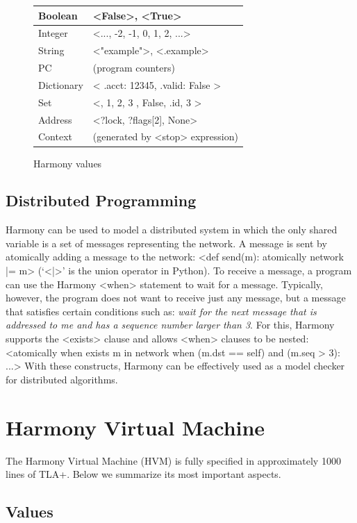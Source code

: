 \documentclass[twocolumn]{article}
\begin{document}
\begin{figure}
\begin{tabular}{|l|l|}
\hline
Boolean & <{False}>, <{True}> \\
\hline
Integer & <{..., -2, -1, 0, 1, 2, ...}> \\
\hline
String & <{"example"}>, <{.example}> \\
\hline
PC & (program counters) \\
\hline
Dictionary & <{{ .acct: 12345, .valid: False }}> \\
\hline
Set & <{{}, { 1, 2, 3 }, { False, .id, 3 }}> \\
\hline
Address & <{?lock, ?flags[2], None}> \\
\hline
Context & (generated by <{stop}> expression) \\
\hline
\end{tabular}
\caption{Harmony values}
\label{fig:values}
\end{figure}

\subsection{Distributed Programming}

Harmony can be used to model a distributed system in which the
only shared variable is a set of messages representing the network.
A message is sent by atomically adding a message to the network:
<{def send(m): atomically network |= {m}}> (`<{|}>' is the union
operator in Python).
To receive a message, a program can use the Harmony <{when}>
statement to wait for a message.  Typically, however, the program
does not want to receive just any message, but a message that satisfies
certain conditions such as: \emph{wait for the next message that is addressed
to me and has a sequence number larger than 3}.
For this, Harmony supports the <{exists}> clause and allows
<{when}> clauses to be nested:
<{atomically when exists m in network when (m.dst == self) and (m.seq > 3): ...}>
With these constructs, Harmony can be effectively used as a
model checker for distributed algorithms.

\section{Harmony Virtual Machine}

The Harmony Virtual Machine (HVM) is fully specified in approximately
1000 lines of TLA+.
Below we summarize its most important aspects.

\subsection{Values}
\end{document}
